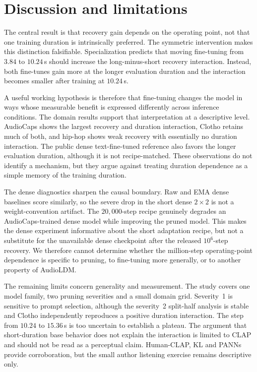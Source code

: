 \section{Discussion and limitations}
The central result is that recovery gain depends on the operating point, not that one training duration is intrinsically preferred. The symmetric intervention makes this distinction falsifiable. Specialization predicts that moving fine-tuning from $3.84$ to $10.24$\,s should increase the long-minus-short recovery interaction. Instead, both fine-tunes gain more at the longer evaluation duration and the interaction becomes smaller after training at $10.24$\,s.

A useful working hypothesis is therefore that fine-tuning changes the model in ways whose measurable benefit is expressed differently across inference conditions. The domain results support that interpretation at a descriptive level. AudioCaps shows the largest recovery and duration interaction, Clotho retains much of both, and hip-hop shows weak recovery with essentially no duration interaction. The public dense text-fine-tuned reference also favors the longer evaluation duration, although it is not recipe-matched. These observations do not identify a mechanism, but they argue against treating duration dependence as a simple memory of the training duration.

The dense diagnostics sharpen the causal boundary. Raw and EMA dense baselines score similarly, so the severe drop in the short dense $2\times2$ is not a weight-convention artifact. The $20{,}000$-step recipe genuinely degrades an AudioCaps-trained dense model while improving the pruned model. This makes the dense experiment informative about the short adaptation recipe, but not a substitute for the unavailable dense checkpoint after the released $10^{6}$-step recovery. We therefore cannot determine whether the million-step operating-point dependence is specific to pruning, to fine-tuning more generally, or to another property of AudioLDM.

The remaining limits concern generality and measurement. The study covers one model family, two pruning severities and a small domain grid. Severity~1 is sensitive to prompt selection, although the severity~2 split-half analysis is stable and Clotho independently reproduces a positive duration interaction. The step from $10.24$ to $15.36$\,s is too uncertain to establish a plateau. The argument that short-duration base behavior does not explain the interaction is limited to CLAP and should not be read as a perceptual claim. Human-CLAP, KL and PANNs provide corroboration, but the small author listening exercise remains descriptive only.

